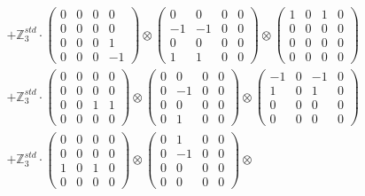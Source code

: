 \documentclass{article}
\begin{document}
{\begin{align}
        &+ \label{Rs1-Rc16-Strassen-1-c12} \mathbb{Z}_3^{std} \cdot 
            \begin{pmatrix} 0 & 0 & 0 & 0 \\ 0 & 0 & 0 & 0 \\ 0 & 0 & 0 & 1 \\ 0 & 0 & 0 & -1 \end{pmatrix} \otimes 
            \begin{pmatrix} 0 & 0 & 0 & 0 \\ -1 & -1 & 0 & 0 \\ 0 & 0 & 0 & 0 \\ 1 & 1 & 0 & 0 \end{pmatrix} \otimes 
            \begin{pmatrix} 1 & 0 & 1 & 0 \\ 0 & 0 & 0 & 0 \\ 0 & 0 & 0 & 0 \\ 0 & 0 & 0 & 0 \end{pmatrix} \\ 
        &+ \label{Rs1-Rc16-Strassen-1-c13} \mathbb{Z}_3^{std} \cdot 
            \begin{pmatrix} 0 & 0 & 0 & 0 \\ 0 & 0 & 0 & 0 \\ 0 & 0 & 1 & 1 \\ 0 & 0 & 0 & 0 \end{pmatrix} \otimes 
            \begin{pmatrix} 0 & 0 & 0 & 0 \\ 0 & -1 & 0 & 0 \\ 0 & 0 & 0 & 0 \\ 0 & 1 & 0 & 0 \end{pmatrix} \otimes 
            \begin{pmatrix} -1 & 0 & -1 & 0 \\ 1 & 0 & 1 & 0 \\ 0 & 0 & 0 & 0 \\ 0 & 0 & 0 & 0 \end{pmatrix} \\ 
        &+ \label{Rs1-Rc16-Strassen-1-c14} \mathbb{Z}_3^{std} \cdot 
            \begin{pmatrix} 0 & 0 & 0 & 0 \\ 0 & 0 & 0 & 0 \\ 1 & 0 & 1 & 0 \\ 0 & 0 & 0 & 0 \end{pmatrix} \otimes 
            \begin{pmatrix} 0 & 1 & 0 & 0 \\ 0 & -1 & 0 & 0 \\ 0 & 0 & 0 & 0 \\ 0 & 0 & 0 & 0 \end{pmatrix} \otimes 

\end{align}}
\end{document}
